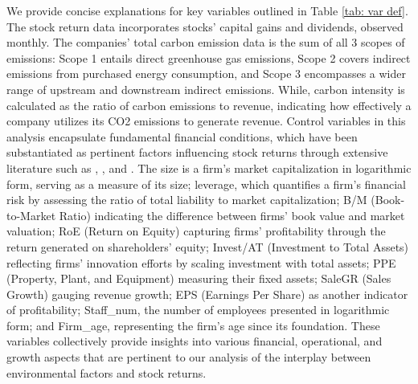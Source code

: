 \documentclass[12pt]{article}
\begin{document}
We provide concise explanations for key variables outlined in Table \ref{tab: var def}. The stock return data incorporates stocks' capital gains and dividends, observed monthly. The companies' total carbon emission data is the sum of all 3 scopes of emissions: Scope 1 entails direct greenhouse gas emissions, Scope 2 covers indirect emissions from purchased energy consumption, and Scope 3 encompasses a wider range of upstream and downstream indirect emissions. While, carbon intensity is calculated as the ratio of carbon emissions to revenue, indicating how effectively a company utilizes its CO2 emissions to generate revenue. Control variables in this analysis encapsulate fundamental financial conditions, which have been substantiated as pertinent factors influencing stock returns through extensive literature such as \cite{aswani2023carbon}, \cite{bolton2023carbon}, and \cite{oestreich2015carbon}. The size is a firm's market capitalization in logarithmic form, serving as a measure of its size; leverage, which quantifies a firm's financial risk by assessing the ratio of total liability to market capitalization; B/M (Book-to-Market Ratio) indicating the difference between firms' book value and market valuation; RoE (Return on Equity) capturing firms' profitability through the return generated on shareholders' equity; Invest/AT (Investment to Total Assets) reflecting firms' innovation efforts by scaling investment with total assets; PPE (Property, Plant, and Equipment) measuring their fixed assets; SaleGR (Sales Growth) gauging revenue growth; EPS (Earnings Per Share) as another indicator of profitability; Staff\_num, the number of employees presented in logarithmic form; and Firm\_age, representing the firm's age since its foundation. These variables collectively provide insights into various financial, operational, and growth aspects that are pertinent to our analysis of the interplay between environmental factors and stock returns.
\end{document}
